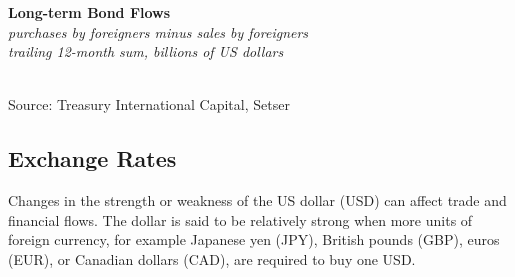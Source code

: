 \documentclass{report}
\makeatletter
\newcommand{\tbllink}[1]{\href{https://raw.githubusercontent.com/bdecon/US-chartbook/master/chartbook/data/#1}{\faTable}}
\newcommand*\short[1]{\expandafter\@gobbletwo\number\numexpr#1\relax}
\newcommand{\ctsbar}[5]{
		\addplot[ybar stacked, bar width=#5, draw opacity=0, fill=#1] 
			table [x=#2, y=#3, col sep=comma]{#4};}
\newcommand{\dateaxisticks}{
		date coordinates in=x, axis line style={draw=none},
		xmax={2022-03-15},
		max space between ticks=40,	    
		xtick={{1990-01-01}, {1992-01-01}, {1994-01-01}, 
			{1996-01-01}, {1998-01-01}, {2000-01-01}, 
			{2002-01-01}, {2004-01-01}, {2006-01-01},
			{2008-01-01}, {2010-01-01}, {2012-01-01}, {2014-01-01},
		    {2016-01-01}, {2018-01-01}, {2020-01-01}, {2022-01-01}, 
		    {2024-01-01}, {2026-01-01}},
		minor xtick={{1989-01-01}, {1991-01-01}, {1993-01-01},
			{1995-01-01}, {1997-01-01}, {1999-01-01}, 
			{2001-01-01}, {2003-01-01}, {2005-01-01}, {2007-01-01},
		    {2009-01-01}, {2011-01-01}, {2013-01-01}, {2015-01-01},
		    {2017-01-01}, {2019-01-01}, {2021-01-01}, {2023-01-01}, 
		    {2025-01-01}, {2027-01-01}},
		enlarge y limits={0.06}, enlarge x limits={0.01},
		}
\newcommand{\bbar}[2]{extra #1 ticks = {{#2}}, extra #1 tick labels = ,
		extra #1 tick style = {grid=major, grid style={thick, black!25}},}
\newcommand{\rbars}{
		\fill[color=black!10] (axis cs:{1990-07-01},\pgfkeysvalueof{/pgfplots/ymin}) rectangle 
			(axis cs:{1991-03-01}, \pgfkeysvalueof{/pgfplots/ymax});
		\fill[color=black!10] (axis cs:{2007-12-01},\pgfkeysvalueof{/pgfplots/ymin}) rectangle 
			(axis cs:{2009-07-01}, \pgfkeysvalueof{/pgfplots/ymax});
		\fill[color=black!10] (axis cs:{2001-03-01},\pgfkeysvalueof{/pgfplots/ymin}) rectangle 
			(axis cs:{2001-11-01}, \pgfkeysvalueof{/pgfplots/ymax});
		\fill[color=black!10] (axis cs:{2020-02-01},\pgfkeysvalueof{/pgfplots/ymin}) rectangle 
			(axis cs:{2020-05-01}, \pgfkeysvalueof{/pgfplots/ymax});}
\makeatother
\begin{document}
{\begin{minipage}{0.76\textwidth}
\normalsize \textbf{Long-term Bond Flows}\\
\footnotesize{\textit{purchases by foreigners minus sales by foreigners}}\\\footnotesize{\textit{trailing 12-month sum, billions of US dollars}}\\
\hspace*{-3mm} \\
\footnotesize{Source: Treasury International Capital, Setser} \hfill \tbllink{tic_bond.csv}
\end{minipage}
\newpage
\hypertarget{extfx}{}
\begin{minipage}{0.76\textwidth}
\subsection*{Exchange Rates}
\small Changes in the strength or weakness of the US dollar (USD) can affect trade and financial flows. The dollar is said to be relatively strong when more units of foreign currency, for example Japanese yen (JPY), British pounds (GBP), euros (EUR), or Canadian dollars (CAD), are required to buy one USD.


\vspace{1mm}


\end{minipage}}
\end{document}

